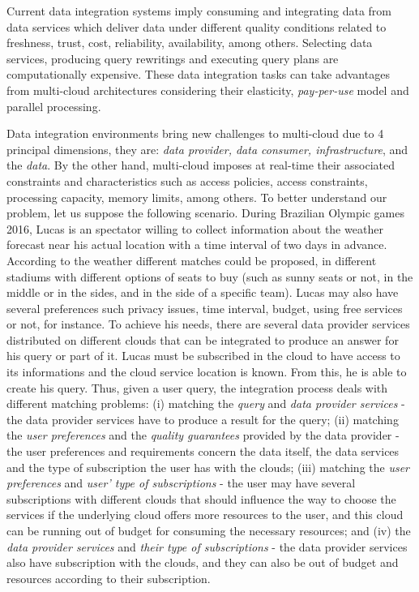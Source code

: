 Current data integration systems imply consuming and integrating data from data services which deliver data under different quality conditions related to freshness, trust, cost, reliability, availability, among others. Selecting data services, producing query rewritings and executing query plans are computationally expensive. These data integration tasks can take advantages from multi-cloud architectures considering their elasticity, \textit{pay-per-use} model and parallel processing.

Data integration environments bring new challenges to multi-cloud due to 4
principal dimensions, they are: \textit{data provider, data consumer,
infrastructure}, and the \textit{data}. By the other hand, multi-cloud imposes at
real-time their associated constraints and characteristics such as access policies, access constraints,
processing capacity, memory limits, among others. 
%
To better understand our problem, let us suppose the following scenario. 
During Brazilian Olympic games 2016, Lucas is an spectator willing to collect information about the weather forecast near his actual location with a time interval of two days in advance. According to the weather different matches could be proposed, in different stadiums with different options of seats to buy (such as sunny seats or not, in the middle or in the sides, and in the side of a specific team).
%
Lucas may also have several preferences such privacy issues, time interval, budget, using free services or not, for instance. 
%
To achieve his needs, there are several data provider services distributed on
different clouds that can be integrated to produce an answer for his query or
part of it. Lucas must be subscribed in the cloud to have access to its
informations and the cloud service location is known. From this, he
is able to create his query.
%
Thus, given a user query, the integration process deals with different matching problems: 
(i) matching the \textit{query} and \textit{data provider services} - the data provider services have to produce a result for the query; 
(ii) matching the \textit{user preferences} and the \textit{quality guarantees} provided by the data provider - the user preferences and requirements concern the data itself, the data services and the type of subscription the user has with the clouds; 
(iii) matching the \textit{user preferences} and \textit{user' type of subscriptions} - the user may have several subscriptions with different clouds that should influence the way to choose the services if the underlying cloud offers more resources to the user, and this cloud can be running out of budget for consuming the necessary resources; and 
(iv) the \textit{data provider services} and \textit{their type of subscriptions} - the data provider services also have  subscription with the clouds, and they can also be out of budget and resources according to their subscription.

